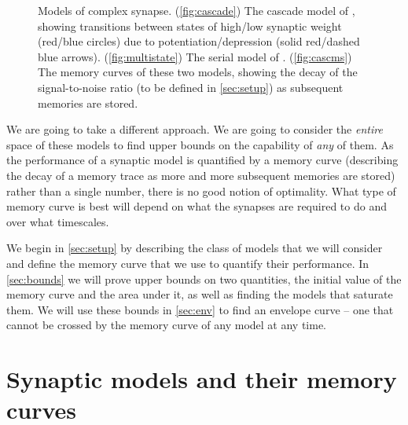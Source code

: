 \documentclass{article} %
\begin{document}
\begin{figure}[tbp]
 \begin{center}
 \begin{myenuma}
  \item{}\label{fig:cascade}
  \item{}\label{fig:multistate}
  \item{}\label{fig:cascms}
 \end{myenuma}
 \end{center}
  \caption{Models of complex synapse.
  (\ref{fig:cascade}) The cascade model of \cite{Fusi2005cascade}, showing transitions between states of high/low synaptic weight (red/blue circles) due to potentiation/depression (solid red/dashed blue arrows).
  (\ref{fig:multistate}) The serial model of \cite{Leibold2008serial}.
  (\ref{fig:cascms}) The memory curves of these two models, showing the decay of the signal-to-noise ratio (to be defined in \autoref{sec:setup}) as subsequent memories are stored.
  }\label{fig:models}
\end{figure}



We are going to take a different approach.
We are going to consider the \emph{entire} space of these models to find upper bounds on the capability of \emph{any} of them.
As the performance of a synaptic model is quantified by a memory curve (describing the decay of a memory trace as more and more subsequent memories are stored) rather than a single number, there is no good notion of optimality.
What type of memory curve is best will depend on what the synapses are required to do and over what timescales.

We begin in \autoref{sec:setup} by describing the class of models that we will consider and define the memory curve that we use to quantify their performance.
In \autoref{sec:bounds} we will prove upper bounds on two quantities, the initial value of the memory curve and the area under it, as well as finding the models that saturate them.
We will use these bounds in \autoref{sec:env} to find an envelope curve -- one that cannot be crossed by the memory curve of any model at any time.




\section{Synaptic models and their memory curves}\label{sec:setup}
\end{document}
